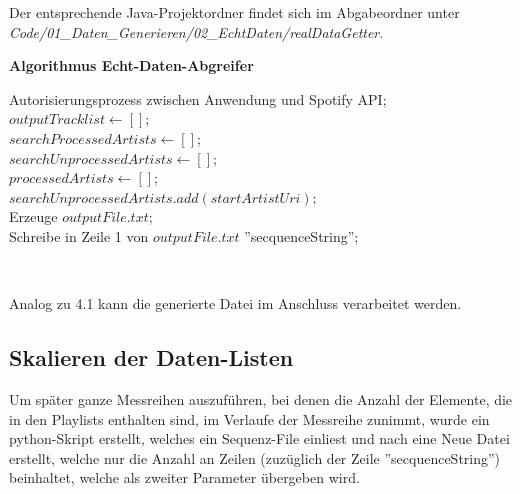 \documentclass[
10pt, %
a4paper, %
oneside, %
headinclude,footinclude, %
BCOR5mm, %
]{scrartcl}
\begin{document}
Der entsprechende Java-Projektordner findet sich im Abgabeordner unter \textit{Code/01\_Daten\_Generieren/02\_EchtDaten/realDataGetter}.

\textbf{Algorithmus Echt-Daten-Abgreifer}\\
\begin{algorithm}[H]
	Autorisierungsprozess zwischen Anwendung und Spotify API;\\
	$outputTracklist \leftarrow []$;\\
	$searchProcessedArtists \leftarrow []$;\\
	$searchUnprocessedArtists \leftarrow []$;\\
	$processedArtists \leftarrow []$;\\	
	$searchUnprocessedArtists.add(startArtistUri)$;\\
	Erzeuge $outputFile.txt$;\\
	Schreibe in Zeile 1 von $outputFile.txt$ ''secquenceString'';\\
\end{algorithm}\

Analog zu 4.1 kann die generierte Datei im Anschluss verarbeitet werden.

\subsection{Skalieren der Daten-Listen}
Um später ganze Messreihen auszuführen, bei denen die Anzahl der Elemente, die in den Playlists enthalten sind, im Verlaufe der Messreihe zunimmt, wurde ein python-Skript erstellt, welches ein Sequenz-File einliest und nach eine Neue Datei erstellt, welche nur die Anzahl an Zeilen (zuzüglich der Zeile ''secquenceString'') beinhaltet, welche als zweiter Parameter übergeben wird.
\end{document}
